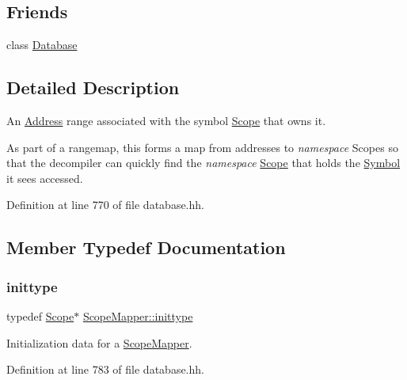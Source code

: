 \subsection*{Friends}
\begin{DoxyCompactItemize}
\item 
class \mbox{\hyperlink{class_scope_mapper_a6efef52d7a939622bbc934ff6b90ffe0}{Database}}
\end{DoxyCompactItemize}


\subsection{Detailed Description}
An \mbox{\hyperlink{class_address}{Address}} range associated with the symbol \mbox{\hyperlink{class_scope}{Scope}} that owns it. 

As part of a rangemap, this forms a map from addresses to {\itshape namespace} Scopes so that the decompiler can quickly find the {\itshape namespace} \mbox{\hyperlink{class_scope}{Scope}} that holds the \mbox{\hyperlink{class_symbol}{Symbol}} it sees accessed. 

Definition at line 770 of file database.\+hh.



\subsection{Member Typedef Documentation}
\mbox{\label{class_scope_mapper_a021edc02284840d933cb7a3217a292ad}} 
\subsubsection{\texorpdfstring{inittype}{inittype}}
{\footnotesize\ttfamily typedef \mbox{\hyperlink{class_scope}{Scope}}$\ast$ \mbox{\hyperlink{class_scope_mapper_a021edc02284840d933cb7a3217a292ad}{Scope\+Mapper\+::inittype}}}



Initialization data for a \mbox{\hyperlink{class_scope_mapper}{Scope\+Mapper}}. 



Definition at line 783 of file database.\+hh.

\mbox{\label{class_scope_mapper_abdcc9189429d97c87bd108d85fcc14ea}} 
